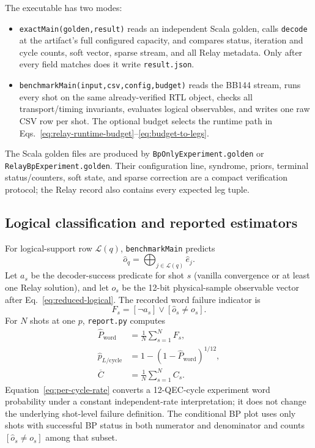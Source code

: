 \documentclass[10pt,conference]{IEEEtran}
\begin{document}
The executable has two modes:
\begin{itemize}
  \item \texttt{exactMain(golden,result)} reads an independent Scala golden,
        calls \texttt{decode} at the artifact's full configured capacity, and
        compares status, iteration and cycle counts, soft vector, sparse stream,
        and all Relay metadata.  Only after every field matches does it write
        \texttt{result.json}.
  \item \texttt{benchmarkMain(input,csv,config,budget)} reads the BB144 stream,
        runs every shot on the same already-verified RTL object, checks all
        transport/timing invariants, evaluates logical observables, and writes
        one raw CSV row per shot.  The optional budget selects the runtime path
        in Eqs.~\eqref{eq:relay-runtime-budget}--\eqref{eq:budget-to-legs}.
\end{itemize}
The Scala golden files are produced by
\texttt{BpOnlyExperiment.golden} or \texttt{RelayBpExperiment.golden}.  Their
configuration line, syndrome, priors, terminal status/counters, soft state, and
sparse correction are a compact verification protocol; the Relay record also
contains every expected leg tuple.

\subsection{Logical classification and reported estimators}
For logical-support row $\mathcal L(q)$, \texttt{benchmarkMain} predicts
\begin{equation}
 \hat o_q=\bigoplus_{j\in\mathcal L(q)}\hat e_j.
 \label{eq:predicted-observable}
\end{equation}
Let $a_s$ be the decoder-success predicate for shot $s$ (vanilla convergence or
at least one Relay solution), and let $o_s$ be the 12-bit physical-sample
observable vector after Eq.~\eqref{eq:reduced-logical}.  The recorded word
failure indicator is
\begin{equation}
 F_s=[\neg a_s]\lor[\hat o_s\neq o_s].
 \label{eq:word-failure-event}
\end{equation}
For $N$ shots at one $p$, \texttt{report.py} computes
\begin{align}
 \widehat P_{\mathrm{word}}&=\frac1N\sum_{s=1}^{N}F_s,
 \label{eq:word-failure-estimator}\\
 \widehat p_{L/\mathrm{cycle}}&=
 1-(1-\widehat P_{\mathrm{word}})^{1/12},
 \label{eq:per-cycle-rate}\\
 \overline C&=\frac1N\sum_{s=1}^{N}C_s.
 \label{eq:mean-cycles}
\end{align}
Equation~\eqref{eq:per-cycle-rate} converts a 12-QEC-cycle experiment word
probability under a constant independent-rate interpretation; it does not
change the underlying shot-level failure definition.  The conditional BP plot
uses only shots with successful BP status in both numerator and denominator and
counts $[\hat o_s\neq o_s]$ among that subset.
\end{document}
